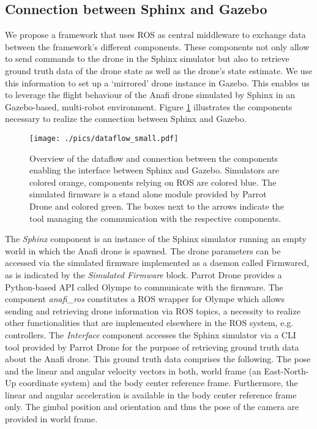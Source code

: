 \subsection{Connection between Sphinx and Gazebo}
We propose a framework that uses ROS as central middleware to exchange data between the framework's different components.  These components not only allow to send commands to the drone in the Sphinx simulator but also to retrieve ground truth data of the drone state as well as the drone's state estimate. We use this information to set up a `mirrored' drone instance in Gazebo. This enables us  to leverage the flight behaviour of the Anafi drone simulated by Sphinx in an Gazebo-based, multi-robot environment. Figure \ref{fig:overview} illustrates the components necessary to realize the connection between Sphinx and Gazebo. 
\begin{figure}[thpb]
      \centering
		\texttt{[image: ./pics/dataflow\_small.pdf]}
\caption{Overview of the dataflow and connection between the components enabling the interface between Sphinx and Gazebo. Simulators are colored orange, components relying on ROS are colored blue. The simulated firmware is a stand alone module provided by Parrot Drone and colored green. The boxes next to the arrows indicate the tool managing the communication with the respective components. }
\label{fig:overview}
 \end{figure}

The \textit{Sphinx} component is an instance of the Sphinx simulator running an empty world in which the Anafi drone is spawned. The drone parameters can be accessed via the simulated firmware implemented as a daemon called Firmwared, as is indicated by the \textit{Simulated Firmware} block. Parrot Drone provides a Python-based API called Olympe to communicate with the firmware. The component \textit{anafi_ros} \cite{sarabakha2023} constitutes a ROS wrapper for Olympe which allows sending and retrieving drone information via ROS topics, a necessity to realize other functionalities that are implemented elsewhere in the ROS system, e.g. controllers.
The \textit{Interface} component accesses the Sphinx simulator via a CLI tool provided by Parrot Drone for the purpose of retrieving ground truth data about the Anafi drone. This ground truth data comprises the following. The pose and the linear and angular velocity vectors in both, world frame (an East-North-Up coordinate system) and the body center reference frame. Furthermore, the linear and angular acceleration is available in the body center reference frame only. The gimbal position and orientation and thus the pose of the camera are provided in world frame.

